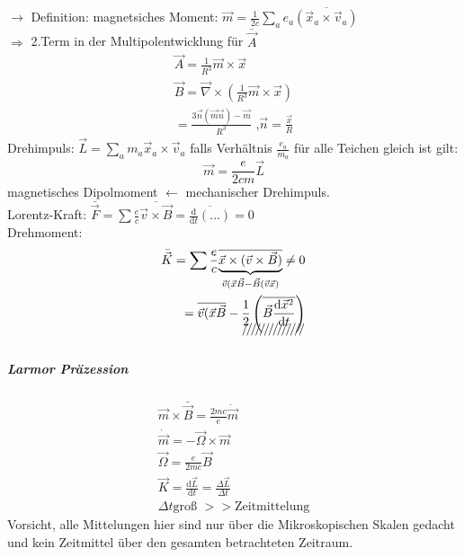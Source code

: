 \documentclass[a4paper]{article}
\begin{document}
$\rightarrow$ Definition:
magnetsiches Moment: $\vec{m}=\frac{1}{2c}\sum_a e_a\overline{\left(
\vec{x}_a\times\vec{v}_a \right)}$\\
$\Rightarrow$ 2.Term in der Multipolentwicklung für $\bar{\vec{A}}$\\
\begin{align}
\vec{A}=\frac{1}{R^3}\vec{m}\times\vec{x}\\
\vec{B}=\vec{\nabla}\times\left( \frac{1}{R^3}\vec{m}\times\vec{x} \right)\\
=\frac{3\vec{n}(\vec{m}\vec{n})-\vec{m}}{R^3}\text{ ,
}\vec{n}=\frac{\vec{x}}{R}
\end{align}
Drehimpuls: $\vec{L}=\sum_a m_a \vec{x}_a\times\vec{v}_a$
falls Verhältnis $\frac{e_a}{m_a}$ für alle Teichen gleich ist gilt:
\begin{equation}
\vec{m}=\frac{e}{2cm}\vec{L}
\end{equation} 
magnetisches Dipolmoment $\leftarrow$ mechanischer Drehimpuls.\\
Lorentz-Kraft: $\bar{\vec{F}}=\sum
\frac{e}{c}\overline{\vec{v}\times\vec{B}}=\overline{\frac{\mathrm{d}}{\mathrm{d}t}\left(\ldots
\right)}=0$\\
Drehmoment: 
\begin{align}
\bar{\vec{K}}=\sum\frac{e}{c}\overline{\underbrace{\vec{x}\times(\vec{v}
\times\vec{B})}_{\vec{v}(\vec{x}\vec{B}-\vec{B}(\vec{v}\vec{x})}}\neq0\\
=\overline{\vec{v}(\vec{x}\vec{B}}-\xout{\frac{1}{2}\left(
\overline{\vec{B}\frac{\mathrm{d}\vec{x}^2}{\mathrm{d}t}} \right)}\\
\end{align}
\subparagraph{Larmor Präzession}
\begin{align}
\vec{m}\times\bar{\vec{B}}=\frac{2mc}{e}\dot{\vec{m}}\\
\dot{\vec{m}}=-\vec{\Omega}\times\vec{m}\\
\vec{\Omega}=\frac{e}{2mc}\vec{B}\\
\vec{K}=\frac{\mathrm{d}\vec{L}}{\mathrm{d}t}=\frac{\Delta\vec{L}}{\Delta t}\\
\Delta t \text{groß }>>\text{Zeitmittelung}
\end{align}
Vorsicht, alle Mittelungen hier sind nur über die Mikroskopischen Skalen gedacht
und kein Zeitmittel über den gesamten betrachteten Zeitraum.
\end{document}

